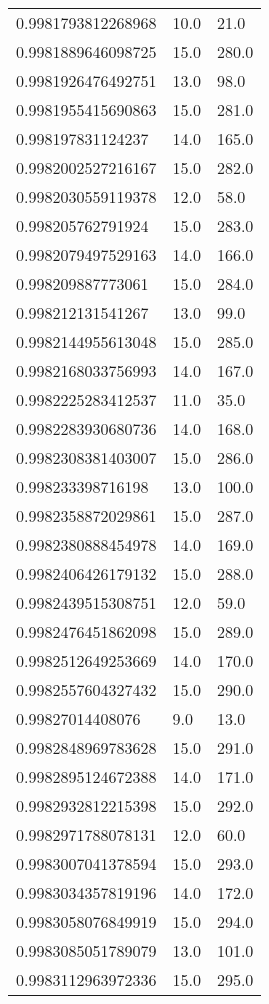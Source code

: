 \begin{center}
\begin{supertabular}[H]{p{0.30\textwidth}p{0.05\textwidth}p{0.05\textwidth}}
0.9981793812268968 & 10.0 & 21.0 \\ 
0.9981889646098725 & 15.0 & 280.0 \\ 
0.9981926476492751 & 13.0 & 98.0 \\ 
0.9981955415690863 & 15.0 & 281.0 \\ 
0.998197831124237 & 14.0 & 165.0 \\ 
0.9982002527216167 & 15.0 & 282.0 \\ 
0.9982030559119378 & 12.0 & 58.0 \\ 
0.998205762791924 & 15.0 & 283.0 \\ 
0.9982079497529163 & 14.0 & 166.0 \\ 
0.998209887773061 & 15.0 & 284.0 \\ 
0.998212131541267 & 13.0 & 99.0 \\ 
0.9982144955613048 & 15.0 & 285.0 \\ 
0.9982168033756993 & 14.0 & 167.0 \\ 
0.9982225283412537 & 11.0 & 35.0 \\ 
0.9982283930680736 & 14.0 & 168.0 \\ 
0.9982308381403007 & 15.0 & 286.0 \\ 
0.998233398716198 & 13.0 & 100.0 \\ 
0.9982358872029861 & 15.0 & 287.0 \\ 
0.9982380888454978 & 14.0 & 169.0 \\ 
0.9982406426179132 & 15.0 & 288.0 \\ 
0.9982439515308751 & 12.0 & 59.0 \\ 
0.9982476451862098 & 15.0 & 289.0 \\ 
0.9982512649253669 & 14.0 & 170.0 \\ 
0.9982557604327432 & 15.0 & 290.0 \\ 
0.99827014408076 & 9.0 & 13.0 \\ 
0.9982848969783628 & 15.0 & 291.0 \\ 
0.9982895124672388 & 14.0 & 171.0 \\ 
0.9982932812215398 & 15.0 & 292.0 \\ 
0.9982971788078131 & 12.0 & 60.0 \\ 
0.9983007041378594 & 15.0 & 293.0 \\ 
0.9983034357819196 & 14.0 & 172.0 \\ 
0.9983058076849919 & 15.0 & 294.0 \\ 
0.9983085051789079 & 13.0 & 101.0 \\ 
0.9983112963972336 & 15.0 & 295.0 \\ 

\end{supertabular}
\end{center}
